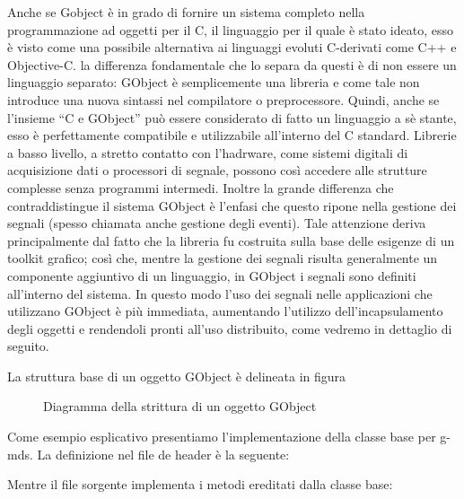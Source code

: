 Anche se Gobject è in grado di fornire un sistema completo nella
programmazione ad oggetti per il C, il linguaggio per il quale è stato
ideato, esso è visto come una possibile alternativa ai linguaggi evoluti
C-derivati come C++ e Objective-C. la differenza fondamentale che lo
separa da questi è di non essere un linguaggio separato: GObject è
semplicemente una libreria e come tale non introduce una nuova sintassi
nel compilatore o preprocessore. Quindi, anche se l'insieme ``C e
GObject'' può essere considerato di fatto un linguaggio a sè stante,
esso è perfettamente compatibile e utilizzabile all'interno del C
standard. Librerie a basso livello, a stretto contatto con l'hadrware,
come sistemi digitali di acquisizione dati o processori di segnale,
possono così accedere alle strutture complesse senza programmi
intermedi. Inoltre la grande differenza che contraddistingue il sistema
GObject è l'enfasi che questo ripone nella gestione dei segnali (spesso
chiamata anche gestione degli eventi). Tale attenzione deriva
principalmente dal fatto che la libreria fu costruita sulla base delle
esigenze di un toolkit grafico; così che, mentre la gestione dei segnali
risulta generalmente un componente aggiuntivo di un linguaggio, in
GObject i segnali sono definiti all'interno del sistema. In questo modo
l'uso dei segnali nelle applicazioni che utilizzano GObject è più
immediata, aumentando l'utilizzo dell'incapsulamento degli oggetti e
rendendoli pronti all'uso distribuito, come vedremo in dettaglio di
seguito.


La struttura base di un oggetto GObject è delineata in figura 
\begin{figure}[!htb]
 \centering
 \caption{Diagramma della strittura di un oggetto GObject}
 \label{fig:gobject}
\end{figure}
Come esempio esplicativo presentiamo l'implementazione della classe base
per g-mds. La definizione nel file de header è la seguente:


Mentre il file sorgente implementa i metodi ereditati dalla classe base:


